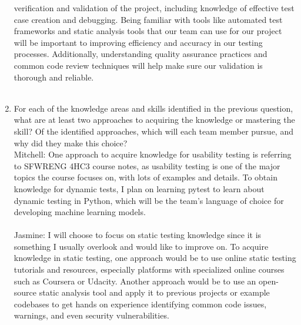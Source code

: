 \documentclass[12pt, titlepage]{article}
\begin{document}
\begin{enumerate}
  verification and validation of the project, including knowledge of effective test case creation and debugging. 
  Being familiar with tools like automated test frameworks and static analysis tools that our team can use for our 
  project will be important to improving efficiency and accuracy in our testing processes. Additionally, understanding 
  quality assurance practices and common code review techniques will help make sure our validation is thorough and reliable. \\\\
  \item For each of the knowledge areas and skills identified in the previous
  question, what are at least two approaches to acquiring the knowledge or
  mastering the skill?  Of the identified approaches, which will each team
  member pursue, and why did they make this choice?\\
  \newline
  \hspace{2em} Mitchell: One approach to acquire knowledge for usability testing is referring to SFWRENG 4HC3 course notes,
  as usability testing is one of the major topics the course focuses on, with lots of examples and details. To obtain knowledge for dynamic tests, I plan on learning pytest to learn about dynamic testing in Python, which will be the
  team's language of choice for developing machine learning models.\\\\
  \hspace{2em} Jasmine: I will choose to focus on static testing knowledge since it is something I usually overlook 
  and would like to improve on. To acquire knowledge in static testing, one approach would be to use online static 
  testing tutorials and resources, especially platforms with specialized online courses such as Coursera or Udacity. 
  Another approach would be to use an open-source static analysis tool and apply it to previous projects or example 
  codebases to get hands on experience identifying common code issues, warnings, and even security vulnerabilities.\\\\

\end{enumerate}
\end{document}
